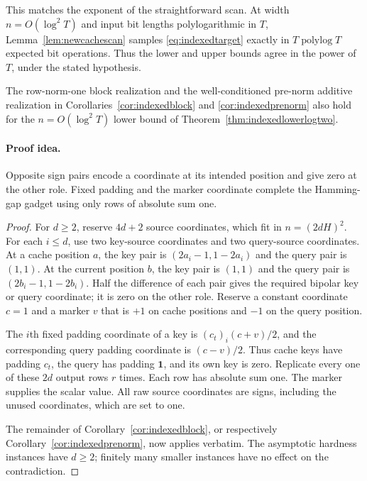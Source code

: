 This matches the exponent of the straightforward scan.  At width
$n=O(\log^2T)$ and input bit lengths polylogarithmic in $T$,
Lemma~\ref{lem:newcachescan} samples \eqref{eq:indexedtarget} exactly
in $T\operatorname{polylog}T$ expected bit operations.  Thus the lower
and upper bounds agree in the power of $T$, under the stated
hypothesis.

\begin{corollary}
\label{cor:indexedlogtwoblock}
The row-norm-one block realization and the well-conditioned pre-norm
additive realization in Corollaries~\ref{cor:indexedblock} and
\ref{cor:indexedprenorm} also hold for the
$n=O(\log^2T)$ lower bound of Theorem~\ref{thm:indexedlowerlogtwo}.
\end{corollary}

\paragraph{Proof idea.}
Opposite sign pairs encode a coordinate at its intended position and give zero at the other role.  Fixed padding and the marker coordinate complete the Hamming-gap gadget using only rows of absolute sum one.

\begin{proof}
For $d\ge2$, reserve $4d+2$ source coordinates, which fit in
$n=(2dH)^2$.  For each $i\le d$, use two key-source coordinates and
two query-source coordinates.  At a cache position $a$, the key pair
is $(2a_i-1,1-2a_i)$ and the query pair is $(1,1)$.  At the current
position $b$, the key pair is $(1,1)$ and the query pair is
$(2b_i-1,1-2b_i)$.  Half the difference of each pair gives the
required bipolar key or query coordinate; it is zero on the other
role.  Reserve a constant coordinate $c=1$ and a marker $v$ that is
$+1$ on cache positions and $-1$ on the query position.

The $i$th fixed padding coordinate of a key is
$(c_t)_i(c+v)/2$, and the corresponding query padding coordinate is
$(c-v)/2$.  Thus cache keys have padding $c_t$, the query has padding
$\boldsymbol1$, and its own key is zero.  Replicate every one of
these $2d$ output rows $r$ times.  Each row has absolute sum one.
The marker supplies the scalar value.  All raw source coordinates
are signs, including the unused coordinates, which are set to one.

The remainder of Corollary~\ref{cor:indexedblock}, or respectively
Corollary~\ref{cor:indexedprenorm}, now applies verbatim.  The
asymptotic hardness instances have $d\ge2$; finitely many smaller
instances have no effect on the contradiction.
\end{proof}

